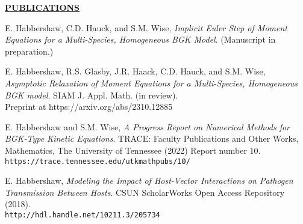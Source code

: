 \documentclass{article}
\begin{document}
\begin{center}
    \textbf{\underline{PUBLICATIONS}}
\end{center}

\begin{etaremune}
    \item E. Habbershaw, C.D. Hauck, and S.M. Wise, \textit{Implicit Euler Step of Moment Equations for a Multi-Species, Homogeneous BGK Model}. (Manuscript in preparation.)
    
    \item E. Habbershaw, R.S. Glasby, J.R. Haack, C.D. Hauck, and S.M. Wise, \textit{Asymptotic Relaxation of Moment Equations for a Multi-Species, Homogeneous BGK model}. SIAM J. Appl. Math. (in review).
    \\
    Preprint at https://arxiv.org/abs/2310.12885
    
    \item E. Habbershaw and S.M. Wise, \textit{A Progress Report on Numerical Methods for BGK-Type Kinetic Equations}.
    TRACE: Faculty Publications and Other Works, Mathematics, The University of Tennessee (2022) Report number 10.
    \\
    \texttt{https://trace.tennessee.edu/utk\textunderscore mathpubs/10/}
    
    \item E. Habbershaw, \textit{Modeling the Impact of Host-Vector Interactions on Pathogen Transmission Between Hosts}.
    CSUN ScholarWorks Open Access Repository (2018).
    \\
    \texttt{http://hdl.handle.net/10211.3/205734}
\end{etaremune}

\end{document}
